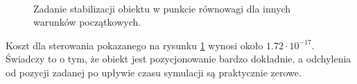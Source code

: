\begin{figure}[H]
	~~
	\caption{Zadanie stabilizacji obiektu w punkcie równowagi dla innych warunków początkowych.}
	\label{fig:stab}
\end{figure}

Koszt dla sterowania pokazanego na rysunku \ref{fig:stab} wynosi około \(1.72 \cdot 10^{-17}\). Świadczy to o tym, że obiekt jest pozycjonowanie bardzo dokładnie, a odchylenia od pozycji zadanej po upływie czasu symulacji są praktycznie zerowe.

